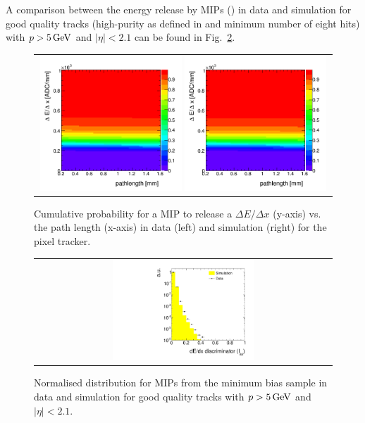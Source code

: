 A comparison between the energy release by MIPs (\ias) in data and simulation for good quality tracks (high-purity as defined in \cite{bib:CMS:Tracking_2010} and minimum number of eight hits) with $p>5\,\text{Ge}\kern-0.06667em\text{V}$ and $|\eta|<2.1$ can be found in Fig.~\ref{fig:Data-MC-Dedx_MIPs}.
\begin{figure}[!tb]
  \centering 
  \begin{tabular}{c}
    \includegraphics[width=0.49\textwidth]{figures/analysis/Discriminator_template_data_pixel_2012.png}
    \includegraphics[width=0.49\textwidth]{figures/analysis/Discriminator_template_mc_pixel_2012.png}
  \end{tabular}
  \caption{Cumulative probability for a MIP to release a $\Delta E/ \Delta x$ (y-axis) vs. the path length (x-axis) in data (left) and simulation (right) for the pixel tracker.}
  \vspace{40pt}
  \label{fig:ProbabilityTemplate}
\end{figure}
\begin{figure}[!bt]
  \centering 
  \begin{tabular}{c}
    \includegraphics[width=0.49\textwidth]{figures/analysis/PixelCalibration/htrackASmiSmallRange_log_MIPs.pdf}
  \end{tabular}
  \caption{Normalised \ias distribution for MIPs from the minimum bias sample in data and simulation for good quality tracks with $p>5\,\text{Ge}\kern-0.06667em\text{V}$ and $|\eta|<2.1$.}
\vspace{40pt}
  \label{fig:Data-MC-Dedx_MIPs}
\end{figure}
